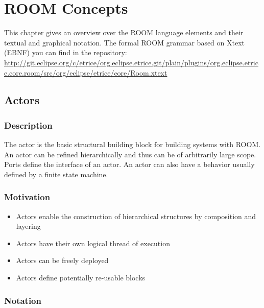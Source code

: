 \chapter{ROOM Concepts}
\label{sec:room_concepts}

This chapter gives an overview over the ROOM language elements and their textual and graphical notation.
The formal ROOM grammar based on Xtext (EBNF) you can find in the \eTrice{} repository:
\url{http://git.eclipse.org/c/etrice/org.eclipse.etrice.git/plain/plugins/org.eclipse.etrice.core.room/src/org/eclipse/etrice/core/Room.xtext}

\section{Actors}

\subsection{Description}
 
The actor is the basic structural building block for building systems with ROOM. An actor can be refined 
hierarchically and thus can be of arbitrarily large scope. Ports define the interface of an actor.
An actor can also have a behavior usually defined by a finite state machine.

\subsection{Motivation}

\begin{itemize}
\item Actors enable the construction of hierarchical structures by composition and layering
\item Actors have their own logical thread of execution
\item Actors can be freely deployed
\item Actors define potentially re-usable blocks
\end{itemize}

\subsection{Notation}

\lstset{numbers=none, language=ROOM}


